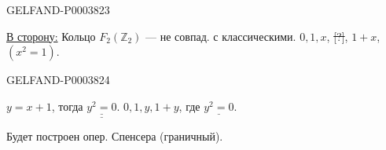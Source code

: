 \begin{GelfandAdjacentEvidence}{GELFAND-P000382}{3}

\underline{В сторону:}
Кольцо $F_2(\mathbb Z_2)$ --- не совпад. с классическими.
$0,1,x$, \sout{[?]}, $1+x$, $(x^2=1)$.
\end{GelfandAdjacentEvidence}
\begin{GelfandAdjacentEvidence}{GELFAND-P000382}{4}

$y=x+1$, тогда $\underline{\underline{y^2=0}}$.
$0,1,y,1+y$, где $\underline{y^2=0}$.
\begin{center}\end{center}
Будет построен опер. Спенсера (граничный).




\end{GelfandAdjacentEvidence}
